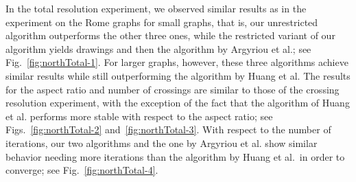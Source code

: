 \documentclass[runningheads]{llncs}
\begin{document}
{In the total resolution experiment, we observed similar results as in the experiment on the Rome graphs for small graphs, that is, our unrestricted algorithm outperforms the other three ones, while the restricted variant of our algorithm yields drawings and then the algorithm by Argyriou et al.; see Fig.~\ref{fig:northTotal-1}. For larger graphs, however, these three algorithms achieve similar results while still outperforming the algorithm by Huang et al. The results for the aspect ratio and number of crossings are similar to those of the crossing resolution experiment, with the exception of the fact that the algorithm of Huang et al. performs more stable with respect to the aspect ratio; see Figs.~\ref{fig:northTotal-2} and~\ref{fig:northTotal-3}. With respect to the number of iterations, our two algorithms and the one by Argyriou et al. show similar behavior needing more iterations than the algorithm by Huang et al.\ in order to converge; see Fig.~\ref{fig:northTotal-4}. %

}
\end{document}
